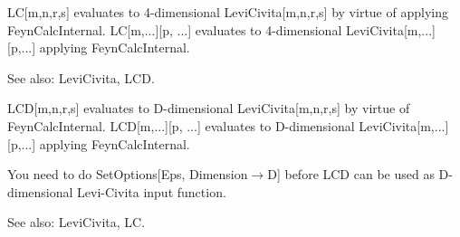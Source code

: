 


LC[m,n,r,s] evaluates to 4-dimensional LeviCivita[m,n,r,s] by virtue of applying FeynCalcInternal. LC[m,...][p, ...] evaluates to
  4-dimensional LeviCivita[m,...][p,...] applying FeynCalcInternal.

See also:  LeviCivita, LCD.






\dispSFinmath{
{{\epsilon }^{\mu \nu \rho \sigma }}
}


\dispSFinmath{
{{\epsilon }^{\mu \nu \rho \sigma }}
}








LCD[m,n,r,s] evaluates to D-dimensional LeviCivita[m,n,r,s] by virtue of FeynCalcInternal. LCD[m,...][p, ...] evaluates to D-dimensional
  LeviCivita[m,...][p,...] applying FeynCalcInternal.

You need to do SetOptions[Eps, Dimension\(\rightarrow \)D] before LCD can be used as D-dimensional Levi-Civita input function.

See also:  LeviCivita, LC.


